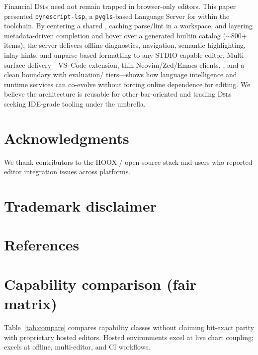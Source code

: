 \documentclass[11pt,a4paper]{article}
\begin{document}
Financial \textsc{Dsl}s need not remain trapped in browser-only editors. This paper
presented \texttt{pynescript-lsp}, a \texttt{pygls}-based Language Server for \pine{}
within the \pyne{} toolchain. By centering a shared \ast{}, caching parse/lint in a
workspace, and layering metadata-driven completion and hover over a generated builtin
catalog (\(\sim\)800+ items), the server delivers offline diagnostics, navigation,
semantic highlighting, inlay hints, and unparse-based formatting to any STDIO-capable
editor. Multi-surface delivery---VS~Code extension, thin Neovim/Zed/Emacs clients,
\cli{}, and a clean boundary with evaluation/\api{} tiers---shows how language
intelligence and runtime services can co-evolve without forcing online dependence for
editing. We believe the architecture is reusable for other bar-oriented and trading
\textsc{Dsl}s seeking IDE-grade tooling under the \lsp{} umbrella.

\section*{Acknowledgments}
We thank contributors to the HOOX / \pyne{} open-source stack and users who reported
editor integration issues across platforms.

\section*{Trademark disclaimer}
\trademarknote{}

\section*{References}



\appendix
\section{Capability comparison (fair matrix)}
\label{app:matrix}

Table~\ref{tab:compare} compares capability classes without claiming bit-exact parity
with proprietary hosted editors. Hosted environments excel at live chart coupling;
\pyne{} excels at offline, multi-editor, and CI workflows.
\end{document}
